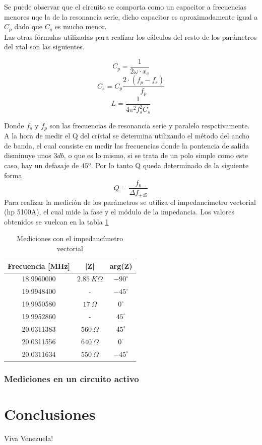 \documentclass[a4paper,10pt]{article}
\begin{document}
		\indent Se puede observar que el circuito se comporta como un capacitor
		a frecuencias menores uqe la de la resonancia serie, dicho capacitor es 
		aproximadamente igual a $C_p$ dado que $C_s$ es mucho menor. \\
		\indent Las otras fórmulas utilizadas para realizar los cálculos del 
		resto de los parámetros del xtal son las siguientes.
		
		$$C_p = \frac{1}{2\omega\cdot x_c}$$
		$$C_s = C_p \frac{2\cdot(f_p - f_s)}{f_p}$$
		$$L = \frac{1}{4\pi^2f_s^2C_s}$$

		\indent Donde $f_s$ y $f_p$ son las frecuencias de resonancia serie y 
		paralelo respctivamente. \\
		\indent A la hora de medir el Q del cristal se determina utilizando el 
		método del ancho de banda, el cual consiste en medir las frecuencias 
		donde la pontencia de salida disminuye unos $3db$, o que es lo mismo, 
		si se trata de un polo simple como este caso, hay un defasaje de $45º$.
		Por lo tanto Q queda determinado de la siguiente forma
		$$Q = \frac{f_0}{\Delta f_{\pm45}}$$
		\indent Para realizar la medición de los parámetros se utiliza el 
		impedancímetro vectorial (hp 5100A), el cual mide la fase y el módulo de
		la impedancia. Los valores obtenidos se vuelcan en la tabla \ref{tab003}

		\begin{table}[!htp]
			\centering
			\begin{tabular}{|c|c|c|}
				\hline
				Frecuencia [MHz] & |Z| & arg(Z) \\
				\hline
				18.9960000 & $2.85~K\Omega$ & $-90^{\circ}$ \\
				\hline
				19.9948400 & - & $-45^{\circ}$ \\ 
				\hline
				19.9950580 & $17~\Omega$ & $0^{\circ}$ \\
				\hline
				19.9952860 & - & $45^{\circ}$ \\ 
				\hline									
				20.0311383 & $560~\Omega$ & $45^{\circ}$ \\
				\hline									
				20.0311556 & $640~\Omega$ & $0^{\circ}$ \\
				\hline									
				20.0311634 & $550~\Omega$ & $-45^{\circ}$ \\
				\hline									
			\end{tabular}
			\caption{Mediciones con el impedancímetro vectorial} \label{tab003}
		\end{table}	

		\subsubsection{Mediciones en un circuito activo}
			
	\section{Conclusiones}
	\indent Viva Venezuela!\\
\end{document}
